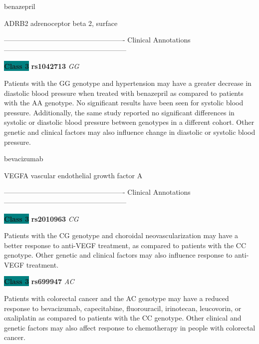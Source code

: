 \documentclass{resume} %
\begin{document}
\begin{rSection}{ benazepril }
\begin{rSubsection}{ ADRB2 }{ adrenoceptor beta 2, surface }{}{}
\item[] ---------------------------------------------------- Clinical Annotations -----------------------------------------------------\newline
\item \textbf{\colorbox{teal} {Class 3}} \textbf{ rs1042713 } \textit{ GG }
\item[] Patients with the GG genotype and hypertension may have a greater decrease in diastolic blood pressure when treated with benazepril as compared to patients with the AA genotype. No significant results have been seen for systolic blood pressure. Additionally, the same study reported no significant differences in systolic or diastolic blood pressure between genotypes in a different cohort. Other genetic and clinical factors may also influence change in diastolic or systolic blood pressure.
\end{rSubsection}

\end{rSection}\begin{rSection}{ bevacizumab }
\item[]

\begin{rSubsection}{ VEGFA }{ vascular endothelial growth factor A }{}{}
\item[]

\item[] ---------------------------------------------------- Clinical Annotations -----------------------------------------------------\newline
\item \textbf{\colorbox{teal} {Class 3}} \textbf{ rs2010963 } \textit{ CG }
\item[] Patients with the CG genotype and choroidal neovascularization may have a better response to anti-VEGF treatment, as compared to patients with the CC genotype. Other genetic and clinical factors may also influence response to anti-VEGF treatment. \item \textbf{\colorbox{teal} {Class 3}} \textbf{ rs699947 } \textit{ AC }
\item[] Patients with colorectal cancer and the AC genotype may have a reduced response to bevacizumab, capecitabine, fluorouracil, irinotecan, leucovorin, or oxaliplatin as compared to patients with the CC genotype. Other clinical and genetic factors may also affect response to chemotherapy in people with colorectal cancer.
\end{rSubsection}


\end{rSection}
\end{document}
